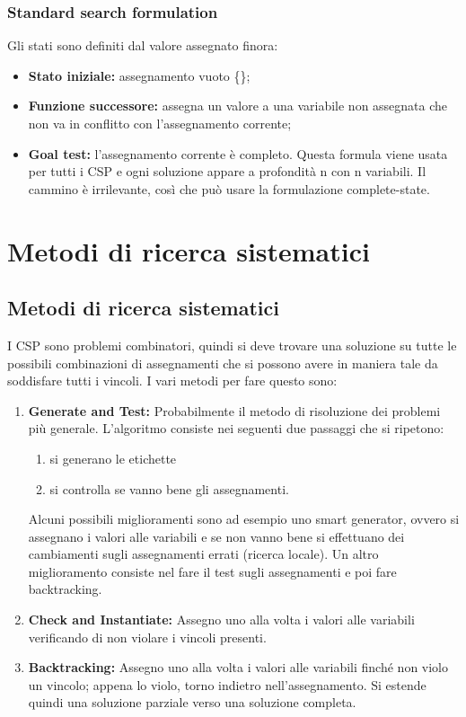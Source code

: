 \subsection{Standard search formulation}
Gli stati sono definiti dal valore assegnato finora:
\begin{itemize}
    \item \textbf{Stato iniziale: }assegnamento vuoto \{\};
    \item \textbf{Funzione successore: }assegna un valore a una variabile non
          assegnata che non va in conflitto con l'assegnamento corrente;
    \item \textbf{Goal test: }l'assegnamento corrente è completo. Questa formula
          viene usata per tutti i CSP e ogni soluzione appare a profondità n con n
          variabili. Il cammino è irrilevante, così che può usare la formulazione
          complete-state.
\end{itemize}


\chapter{Metodi di ricerca sistematici} \label{ch:Metodi di ricerca sistematici}
\section{Metodi di ricerca sistematici}
I CSP sono problemi combinatori, quindi si deve trovare una soluzione su tutte le possibili combinazioni di assegnamenti che si possono avere in maniera tale da soddisfare tutti i vincoli. I vari metodi per fare questo sono:
\begin{enumerate}
    \item \textbf{Generate and Test: }Probabilmente il metodo di risoluzione dei problemi più generale. L'algoritmo consiste nei seguenti due passaggi che si ripetono:
          \begin{enumerate}
              \item si generano le etichette
              \item si controlla se vanno bene gli assegnamenti.
          \end{enumerate}
          Alcuni possibili miglioramenti sono ad esempio uno smart generator, ovvero si assegnano i valori alle variabili e se non vanno bene si effettuano dei cambiamenti sugli assegnamenti errati (ricerca locale). Un altro miglioramento consiste nel fare il test sugli assegnamenti e poi fare backtracking.
    \item \textbf{Check and Instantiate: }Assegno uno alla volta i valori alle variabili verificando di non violare i vincoli presenti.
    \item \textbf{Backtracking:} Assegno uno alla volta i valori alle variabili finché non violo un vincolo; appena lo violo, torno indietro nell'assegnamento. Si estende quindi una soluzione parziale verso una soluzione completa.
\end{enumerate}


